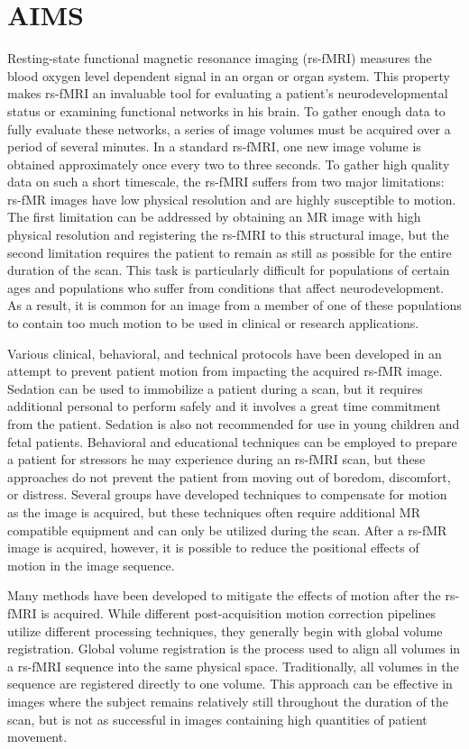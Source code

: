 \chapter{AIMS}

Resting-state functional magnetic resonance imaging (rs-fMRI) measures the blood oxygen level dependent signal in an organ or organ system. This property makes rs-fMRI an invaluable tool for evaluating a patient's neurodevelopmental status or examining functional networks in his brain. To gather enough data to fully evaluate these networks, a series of image volumes must be acquired over a period of several minutes. In a standard rs-fMRI, one new image volume is obtained approximately once every two to three seconds. To gather high quality data on such a short timescale, the rs-fMRI suffers from two major limitations: rs-fMR images have low physical resolution and are highly susceptible to motion. The first limitation can be addressed by obtaining an MR image with high physical resolution and registering the rs-fMRI to this structural image, but the second limitation requires the patient to remain as still as possible for the entire duration of the scan. This task is particularly difficult for populations of certain ages and populations who suffer from conditions that affect neurodevelopment. As a result, it is common for an image from a member of one of these populations to contain too much motion to be used in clinical or research applications.

Various clinical, behavioral, and technical protocols have been developed in an attempt to prevent patient motion from impacting the acquired rs-fMR image. Sedation can be used to immobilize a patient during a scan, but it requires additional personal to perform safely and it involves a great time commitment from the patient. Sedation is also not recommended for use in young children and fetal patients. Behavioral and educational techniques can be employed to prepare a patient for stressors he may experience during an rs-fMRI scan, but these approaches do not prevent the patient from moving out of boredom, discomfort, or distress. Several groups have developed techniques to compensate for motion as the image is acquired, but these techniques often require additional MR compatible equipment and can only be utilized during the scan. After a rs-fMR image is acquired, however, it is possible to reduce the positional effects of motion in the image sequence.

Many methods have been developed to mitigate the effects of motion after the rs-fMRI is acquired. While different post-acquisition motion correction pipelines utilize different processing techniques, they generally begin with global volume registration. Global volume registration is the process used to align all volumes in a rs-fMRI sequence into the same physical space. Traditionally, all volumes in the sequence are registered directly to one volume. This approach can be effective in images where the subject remains relatively still throughout the duration of the scan, but is not as successful in images containing high quantities of patient movement.

